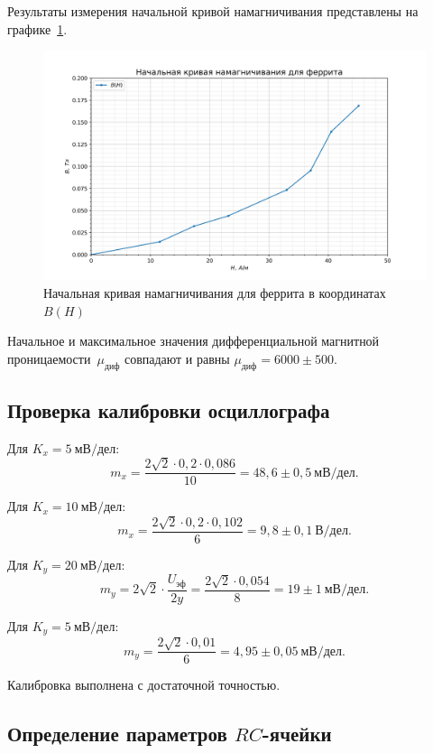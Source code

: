 \documentclass[a4paper, 12pt]{article}
\begin{document}
Результаты измерения начальной кривой намагничивания представлены на графике~\ref{fig:Ferrit:nach_petlya}.

\begin{figure}[h!]
\begin{center}
    \includegraphics[scale=0.7]{3.4.5_3.png}
\end{center}
\caption{Начальная кривая намагничивания для феррита в координатах $B(H)$}
\label{fig:Ferrit:nach_petlya}
\end{figure}

Начальное и максимальное значения дифференциальной магнитной проницаемости~$\mu_{диф}$ совпадают и равны $\mu_{диф} = 6000\pm500$.

\newpage

\subsection{Проверка калибровки осциллографа}

Для $K_x = 5~мВ/дел$:
$$m_x = \frac{2\sqrt{2} \cdot 0,2  \cdot 0,086}{10} = 48,6\pm0,5~мВ/дел.$$

Для $K_x = 10~мВ/дел$:
$$m_x = \frac{2\sqrt{2} \cdot 0,2  \cdot 0,102}{6} = 9,8\pm0,1~В/дел.$$

Для $K_y = 20~мВ/дел$:
$$m_y = 2\sqrt{2} \cdot \frac{U_{эф}}{2y} = \frac{2\sqrt{2} \cdot 0,054}{8} = 19\pm1~мВ/дел.$$

Для $K_y = 5~мВ/дел$:
$$m_y = \frac{2\sqrt{2} \cdot 0,01}{6} = 4,95\pm0,05~мВ/дел.$$

Калибровка выполнена с достаточной точностью.

\subsection{Определение параметров $RC$-ячейки}
\end{document}
